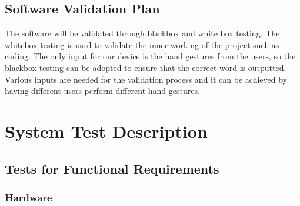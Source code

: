 \documentclass[12pt]{article}
\begin{document}
\subsection{Software Validation Plan}

The software will be validated through blackbox and white box  testing. The whitebox testing is used to validate the inner working of the project such as coding. The only input for our device is the hand gestures from the users, so the blackbox testing can be adopted to ensure that the correct word is outputted. Various inputs are needed for the validation process and it can be achieved by having different users perform different hand gestures.

\section{System Test Description}
	
\subsection{Tests for Functional Requirements}


\subsubsection{Hardware}
		
  
\end{document}
